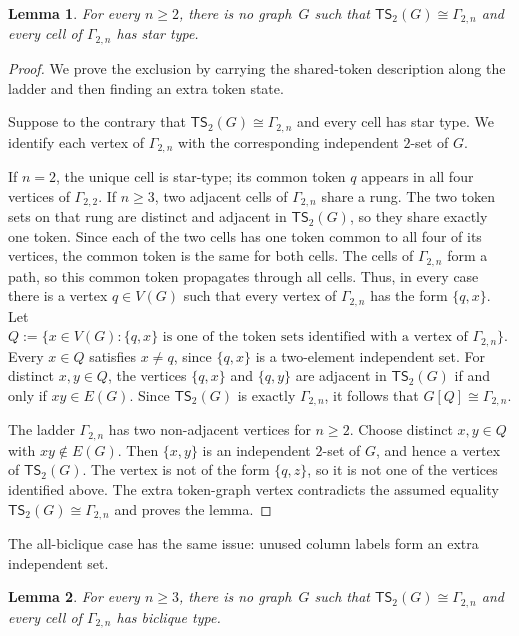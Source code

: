 \documentclass[a4paper]{article}
\theoremstyle{plain}
\newtheorem{lemma}[lemma]{Lemma}
\theoremstyle{definition}
\newcommand{\TSsym}{\mathsf{TS}}
\numberwithin{equation}{section}
\begin{document}
\begin{lemma}
\label{lem:ladder-star-phase}
For every $n\ge 2$, there is no graph~$G$ such that $\TSsym_2(G)\cong \Gamma_{2,n}$ and every cell of $\Gamma_{2,n}$ has star type.
\end{lemma}

\begin{proof}
We prove the exclusion by carrying the shared-token description along the ladder and then finding an extra token state.

Suppose to the contrary that $\TSsym_2(G)\cong \Gamma_{2,n}$ and every cell has star type.
We identify each vertex of $\Gamma_{2,n}$ with the corresponding independent $2$-set of $G$.

If $n=2$, the unique cell is star-type; its common token $q$ appears in all four vertices of $\Gamma_{2,2}$.
If $n\ge 3$, two adjacent cells of $\Gamma_{2,n}$ share a rung.
The two token sets on that rung are distinct and adjacent in $\TSsym_2(G)$, so they share exactly one token.
Since each of the two cells has one token common to all four of its vertices, the common token is the same for both cells.
The cells of $\Gamma_{2,n}$ form a path, so this common token propagates through all cells.
Thus, in every case there is a vertex $q\in V(G)$ such that every vertex of $\Gamma_{2,n}$ has the form $\{q,x\}$.
Let $Q:=\{x\in V(G):\{q,x\}\text{ is one of the token sets identified with a vertex of }\Gamma_{2,n}\}$.
Every $x\in Q$ satisfies $x\ne q$, since $\{q,x\}$ is a two-element independent set.
For distinct $x,y\in Q$, the vertices $\{q,x\}$ and $\{q,y\}$ are adjacent in $\TSsym_2(G)$ if and only if $xy\in E(G)$.
Since $\TSsym_2(G)$ is exactly $\Gamma_{2,n}$, it follows that $G[Q]\cong \Gamma_{2,n}$.

The ladder $\Gamma_{2,n}$ has two non-adjacent vertices for $n\ge 2$.
Choose distinct $x,y\in Q$ with $xy\notin E(G)$.
Then $\{x,y\}$ is an independent $2$-set of $G$, and hence a vertex of $\TSsym_2(G)$.
The vertex is not of the form $\{q,z\}$, so it is not one of the vertices identified above.
The extra token-graph vertex contradicts the assumed equality $\TSsym_2(G)\cong\Gamma_{2,n}$ and proves the lemma.
\end{proof}

The all-biclique case has the same issue: unused column labels form an extra independent set.

\begin{lemma}
\label{lem:ladder-biclique-phase}
For every $n\ge 3$, there is no graph~$G$ such that $\TSsym_2(G)\cong \Gamma_{2,n}$ and every cell of $\Gamma_{2,n}$ has biclique type.
\end{lemma}
\end{document}
